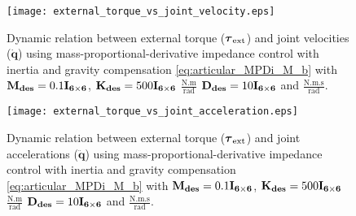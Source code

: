\begin{figure}
\centering
\texttt{[image: external\_torque\_vs\_joint\_velocity.eps]}
\caption{Dynamic relation between external torque ($\boldsymbol{\tau}_\mathrm{ext}$) and joint velocities ($\mathbf{\dot{q}}$) using mass-proportional-derivative impedance control with inertia and gravity compensation \eqref{eq:articular_MPDi_M_b} with $\mathbf{M_{des}}=0.1\mathbf{I_{6 \times 6}}$, $\mathbf{K_{des}}=500\mathbf{I_{6 \times 6}}$ $\mathrm{\frac{N.m}{rad}}$ $\mathbf{D_{des}}=10\mathbf{I_{6 \times 6}}$ and $\mathrm{\frac{N.m.s}{rad}}$.}
\label{fig:act1.4_tau_vs_dq}
\end{figure}

\begin{figure}
\centering
\texttt{[image: external\_torque\_vs\_joint\_acceleration.eps]}
\caption{Dynamic relation between external torque ($\boldsymbol{\tau}_\mathrm{ext}$) and joint accelerations ($\mathbf{\ddot{q}}$) using mass-proportional-derivative impedance control with inertia and gravity compensation \eqref{eq:articular_MPDi_M_b} with $\mathbf{M_{des}}=0.1\mathbf{I_{6 \times 6}}$, $\mathbf{K_{des}}=500\mathbf{I_{6 \times 6}}$ $\mathrm{\frac{N.m}{rad}}$ $\mathbf{D_{des}}=10\mathbf{I_{6 \times 6}}$ and $\mathrm{\frac{N.m.s}{rad}}$.}
\label{fig:act1.4_tau_vs_ddq}
\end{figure}

